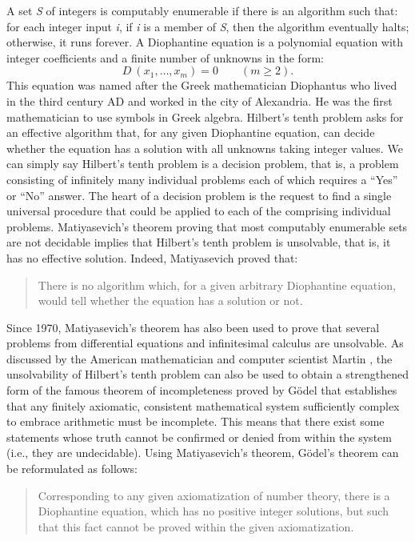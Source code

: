 A set \textit{S} of integers is computably enumerable if there is an algorithm such that: for each integer input \textit{i}, if \textit{i} is a member of \textit{S}, then the algorithm eventually halts; otherwise, it runs forever. A Diophantine equation is a polynomial equation with integer coefficients and a finite number of unknowns in the form:
\[
D\ (x_{1} ,\ldots ,x_{m} )=0\qquad (m\ge 2).
\]
This equation was named after the Greek mathematician Diophantus who lived in the third century AD and worked in the city of Alexandria. He was the first mathematician to use symbols in Greek algebra. Hilbert's tenth problem asks for an effective algorithm that, for any given Diophantine equation, can decide whether the equation has a solution with all unknowns taking integer values. We can simply say Hilbert's tenth problem is a decision problem, that is, a problem consisting of infinitely many individual problems each of which requires a ``Yes'' or ``No'' answer. The heart of a decision problem is the request to find a single universal procedure that could be applied to each of the comprising individual problems. Matiyasevich's theorem proving that most computably enumerable sets are not decidable implies that Hilbert's tenth problem is unsolvable, that is, it has no effective solution. Indeed, Matiyasevich proved that:

\begin{quote}
There is no algorithm which, for a given arbitrary Diophantine equation, would tell whether the equation has a solution or not.
\end{quote}

Since 1970, Matiyasevich's theorem has also been used to prove that several problems from differential equations and infinitesimal calculus are unsolvable. As discussed by the American mathematician and computer scientist Martin \citet{chap:11:Davis:1973}, the unsolvability of Hilbert's tenth problem can also be used to obtain a strengthened form of the famous theorem of incompleteness proved by G\"{o}del that establishes that any finitely axiomatic, consistent mathematical system sufficiently complex to embrace arithmetic must be incomplete. This means that there exist some statements whose truth cannot be confirmed or denied from within the system (i.e., they are undecidable). Using Matiyasevich's theorem, G\"{o}del's theorem can be reformulated as follows:

\begin{quote}
Corresponding to any given axiomatization of number theory, there is a Diophantine equation, which has no positive integer solutions, but such that this fact cannot be proved within the given axiomatization.
\end{quote}

